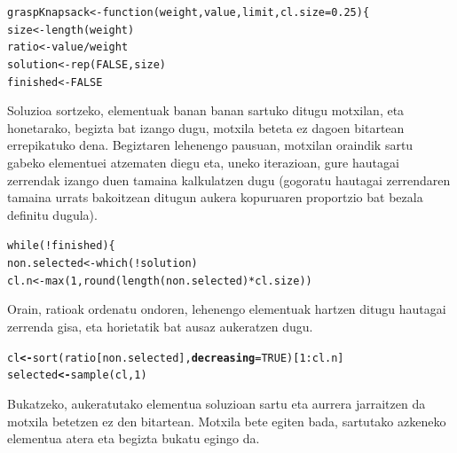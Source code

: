 \documentclass[eu]{ifirak}\usepackage[]{graphicx}\usepackage[]{color}
\makeatletter
\newcommand{\hlnum}[1]{\textcolor[rgb]{0.659,0.4,0.051}{#1}}%
\newcommand{\hlopt}[1]{\textcolor[rgb]{0,0,0}{#1}}%
\newcommand{\hlstd}[1]{\textcolor[rgb]{0,0,0}{#1}}%
\newcommand{\hlkwb}[1]{\textcolor[rgb]{0.549,0.114,0.412}{\textbf{#1}}}%
\newcommand{\hlkwc}[1]{\textcolor[rgb]{0.659,0.573,0.133}{\textbf{#1}}}%
\newcommand{\hlkwd}[1]{\textcolor[rgb]{0.659,0.133,0.482}{#1}}%
\newenvironment{kframe}{%
 \def\at@end@of@kframe{}%
 \ifinner\ifhmode%
  \def\at@end@of@kframe{\end{minipage}}%
  \begin{minipage}{\columnwidth}%
 \fi\fi%
 \def\FrameCommand##1{\hskip\@totalleftmargin \hskip-\fboxsep
 \colorbox{shadecolor}{##1}\hskip-\fboxsep
     \hskip-\linewidth \hskip-\@totalleftmargin \hskip\columnwidth}%
 \MakeFramed {\advance\hsize-\width
   \@totalleftmargin\z@ \linewidth\hsize
   \@setminipage}}%
 {\par\unskip\endMakeFramed%
 \at@end@of@kframe}
\newenvironment{knitrout}{}{} %
\makeatother
\begin{document}
\begin{knitrout}
\color{fgcolor}\begin{kframe}
\begin{alltt}
graspKnapsack <- \hlkwd{function}(weight, value, limit, cl.size=0.25) \{
  size <- \hlkwd{length}(weight)
  ratio <- value / weight
  solution <- \hlkwd{rep}(FALSE, size)
  finished <- FALSE
\end{alltt}
\end{kframe}
\end{knitrout}

Soluzioa sortzeko, elementuak banan banan sartuko ditugu motxilan, eta honetarako, begizta bat izango dugu, motxila beteta ez dagoen bitartean errepikatuko dena. Begiztaren lehenengo pausuan, motxilan oraindik sartu gabeko elementuei atzematen diegu eta, uneko iterazioan, gure hautagai zerrendak izango duen tamaina kalkulatzen dugu (gogoratu hautagai zerrendaren tamaina urrats bakoitzean ditugun aukera kopuruaren proportzio bat bezala definitu dugula).

\begin{knitrout}
\color{fgcolor}\begin{kframe}
\begin{alltt}
  \hlkwd{while} (!finished) \{
    non.selected <- \hlkwd{which}(!solution)
    cl.n <- \hlkwd{max}(1, \hlkwd{round}(\hlkwd{length}(non.selected) * cl.size))
\end{alltt}
\end{kframe}
\end{knitrout}

Orain, ratioak ordenatu ondoren, lehenengo elementuak hartzen ditugu hautagai zerrenda gisa, eta horietatik bat ausaz aukeratzen dugu.

\begin{knitrout}
\color{fgcolor}\begin{kframe}
\begin{alltt}
    \hlstd{cl} \hlkwb{<-} \hlkwd{sort}\hlstd{(ratio[non.selected],} \hlkwc{decreasing}\hlstd{=}\hlnum{TRUE}\hlstd{)[}\hlnum{1}\hlopt{:}\hlstd{cl.n]}
    \hlstd{selected} \hlkwb{<-} \hlkwd{sample}\hlstd{(cl,} \hlnum{1}\hlstd{)}
\end{alltt}
\end{kframe}
\end{knitrout}

Bukatzeko, aukeratutako elementua soluzioan sartu eta aurrera jarraitzen da motxila betetzen ez den bitartean. Motxila bete egiten bada, sartutako azkeneko elementua atera eta begizta bukatu egingo da.
\end{document}
